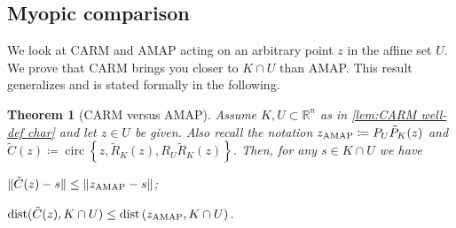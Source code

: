 \documentclass[smallextended,numbook,nospthms]{svjour3}
\theoremstyle{plain}
\newtheorem{theorem}{Theorem}[subsection]
\theoremstyle{definition}
\def\RR{\mathds R}
\DeclareMathOperator{\dist}{dist}
\DeclareMathOperator{\circum}{circ}
\newcommand{\AMAP}{{\rm AMAP}}
\begin{document}
\subsection{Myopic comparison}\label{subsec:myopic comp}

We look at CARM and AMAP acting on an arbitrary point $z$ in the affine set $U$. We prove that CARM brings you closer to $K \cap U$ than AMAP. This result generalizes \cite[Theorem 2]{Behling:2020} and is stated formally in the following.

\begin{theorem}[CARM versus AMAP]\label{thm:CARM x AMAP} Assume $K, U \subset \RR^{n}$ as in  \cref{lem:CARM well-def char} and let $z \in U$ be given. Also recall the notation $z_{\mathrm{\AMAP}}\coloneqq P_{U}\tilde{P}_{K}(z)$ and $\tilde{C}(z)\coloneqq \circum \left\{z, \tilde{R}_{K}(z), R_{U} \tilde{R}_{K}(z)\right\}$.
	Then, for any $s \in K \cap U$ we have
	\begin{listi}
		\item $\|\tilde{C}(z)-s\| \leq\left\|z_{\AMAP}-s\right\|$;
		\item $\dist(\tilde{C}(z), K \cap U) \leq \dist\left(z_{\mathrm{\AMAP}}, K \cap U\right)$.
	\end{listi}
\end{theorem}
\end{document}
